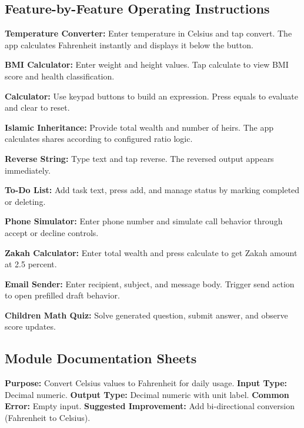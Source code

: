 \documentclass{article}
\begin{document}
\subsection{Feature-by-Feature Operating Instructions}
\textbf{Temperature Converter:} Enter temperature in Celsius and tap convert. The app calculates Fahrenheit instantly and displays it below the button.

\textbf{BMI Calculator:} Enter weight and height values. Tap calculate to view BMI score and health classification.

\textbf{Calculator:} Use keypad buttons to build an expression. Press equals to evaluate and clear to reset.

\textbf{Islamic Inheritance:} Provide total wealth and number of heirs. The app calculates shares according to configured ratio logic.

\textbf{Reverse String:} Type text and tap reverse. The reversed output appears immediately.

\textbf{To-Do List:} Add task text, press add, and manage status by marking completed or deleting.

\textbf{Phone Simulator:} Enter phone number and simulate call behavior through accept or decline controls.

\textbf{Zakah Calculator:} Enter total wealth and press calculate to get Zakah amount at 2.5 percent.

\textbf{Email Sender:} Enter recipient, subject, and message body. Trigger send action to open prefilled draft behavior.

\textbf{Children Math Quiz:} Solve generated question, submit answer, and observe score updates.

\subsection{Module Documentation Sheets}
\begin{featurebox}
\textbf{Purpose:} Convert Celsius values to Fahrenheit for daily usage.\newline
\textbf{Input Type:} Decimal numeric.\newline
\textbf{Output Type:} Decimal numeric with unit label.\newline
\textbf{Common Error:} Empty input.\newline
\textbf{Suggested Improvement:} Add bi-directional conversion (Fahrenheit to Celsius).
\end{featurebox}
\end{document}
